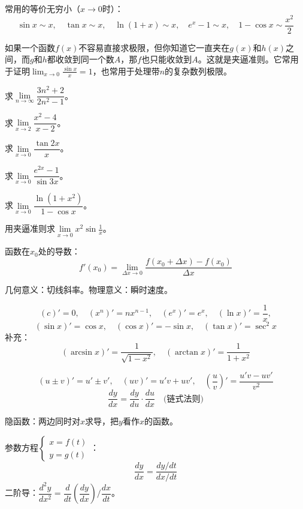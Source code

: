 \documentclass[a4paper,12pt]{ctexart}
\begin{document}
常用的等价无穷小（$x\to0$时）：
\[
\sin x\sim x,\quad \tan x\sim x,\quad \ln(1+x)\sim x,\quad e^x-1\sim x,\quad 1-\cos x\sim\frac{x^2}{2}
\]


如果一个函数$f(x)$不容易直接求极限，但你知道它一直夹在$g(x)$和$h(x)$之间，而$g$和$h$都收敛到同一个数$A$，那$f$也只能收敛到$A$。这就是夹逼准则。它常用于证明$\lim_{x\to0}\frac{\sin x}{x}=1$，也常用于处理带$n$的复杂数列极限。


\begin{exercise}
\item 求$\lim\limits_{n\to\infty}\dfrac{3n^2+2}{2n^2-1}$。
\item 求$\lim\limits_{x\to2}\dfrac{x^2-4}{x-2}$。
\item 求$\lim\limits_{x\to0}\dfrac{\tan 2x}{x}$。
\item 求$\lim\limits_{x\to0}\dfrac{e^{2x}-1}{\sin3x}$。
\item 求$\lim\limits_{x\to0}\dfrac{\ln(1+x^2)}{1-\cos x}$。
\item 用夹逼准则求$\lim\limits_{x\to0}x^2\sin\frac1x$。
\end{exercise}

\newpage



函数在$x_0$处的导数：
\[
f'(x_0)=\lim_{\Delta x\to0}\frac{f(x_0+\Delta x)-f(x_0)}{\Delta x}
\]

几何意义：切线斜率。物理意义：瞬时速度。


\[
(c)'=0,\quad (x^n)'=nx^{n-1},\quad (e^x)'=e^x,\quad (\ln x)'=\frac1x,
\]
\[
(\sin x)'=\cos x,\quad (\cos x)'=-\sin x,\quad (\tan x)'=\sec^2 x
\]
补充：
\[
(\arcsin x)'=\frac1{\sqrt{1-x^2}},\quad
(\arctan x)'=\frac1{1+x^2}
\]


\[
(u\pm v)'=u'\pm v',\quad (uv)'=u'v+uv',\quad \left(\frac uv\right)'=\frac{u'v-uv'}{v^2}
\]
\[
\frac{dy}{dx}=\frac{dy}{du}\cdot\frac{du}{dx}\quad\text{(链式法则)}
\]


隐函数：两边同时对$x$求导，把$y$看作$x$的函数。

参数方程$\begin{cases}x=f(t)\\y=g(t)\end{cases}$：
\[
\frac{dy}{dx}=\frac{dy/dt}{dx/dt}
\]
二阶导：$\dfrac{d^2y}{dx^2}=\dfrac{d}{dt}\left(\dfrac{dy}{dx}\right)\Big/\dfrac{dx}{dt}$。
\end{document}
